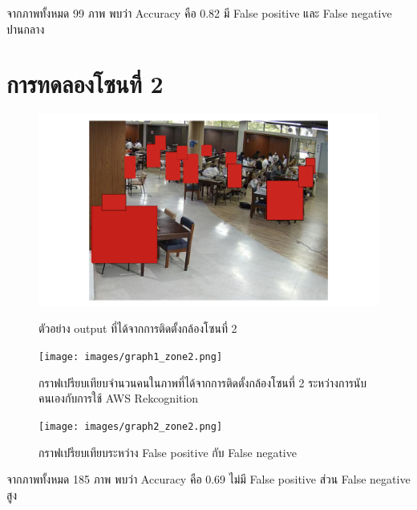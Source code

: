จากภาพทั้งหมด 99 ภาพ พบว่า Accuracy คือ 0.82 มี False positive และ False negative ปานกลาง

\newpage
\section{การทดลองโซนที่ 2}
\begin{figure}[ht]
    \centering
    \includegraphics[width=\textwidth]{images/modified_Picture (102).png}
    \caption[ตัวอย่าง output ที่ได้จากการติดตั้งกล้องโซนที่ 2]{ตัวอย่าง output ที่ได้จากการติดตั้งกล้องโซนที่ 2}
    \label{fig:output2}
    \centering
    \texttt{[image: images/graph1\_zone2.png]}
    \caption[กราฟเปรียบเทียบจำนวนคนในภาพที่ได้จากการติดตั้งกล้องโซนที่ 2 ระหว่างการนับคนเองกับการใช้ AWS Rekcognition]{กราฟเปรียบเทียบจำนวนคนในภาพที่ได้จากการติดตั้งกล้องโซนที่ 2 ระหว่างการนับคนเองกับการใช้ AWS Rekcognition}
    \label{fig:graph1-2}
\end{figure}
\newpage
\begin{figure}[ht]
    \centering
    \texttt{[image: images/graph2\_zone2.png]}
    \caption[graph2-2]{กราฟเปรียบเทียบระหว่าง False positive กับ False negative}
    \label{fig:graph2-2}
\end{figure}
จากภาพทั้งหมด 185 ภาพ พบว่า Accuracy คือ 0.69 ไม่มี False positive ส่วน False negative สูง

\newpage
